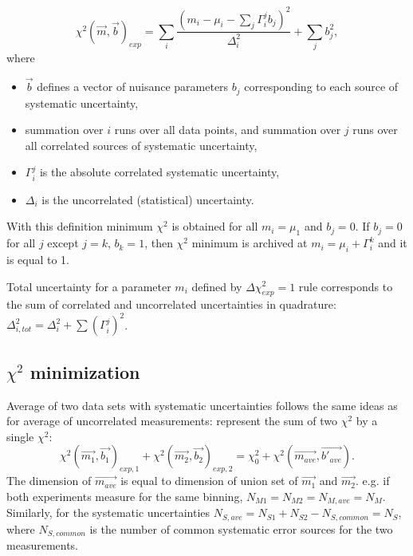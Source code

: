 \begin{equation}
  \chi^2(\vec{m},\vec{b})_{exp} = \sum_{i} \frac{(m_i-\mu_i-\sum_j \Gamma_i^j b_j)^2}{\Delta_i^2} + \sum_{j}
  b_j^2,
  \label{Eq:CorrChiSq}
\end{equation}
where
\begin{itemize}
\item $\vec{b}$ defines a vector of nuisance parameters $b_j$ corresponding to each source of systematic uncertainty,
\item summation over $i$ runs over all data points, and summation over $j$ runs over all correlated sources of systematic uncertainty,
\item $\Gamma_i^j$ is the absolute correlated systematic uncertainty, 
\item $\Delta_i$ is the uncorrelated (statistical) uncertainty.
\end{itemize}
With this definition minimum $\chi^2$ is obtained for all $m_i = \mu_1$ and $b_j=0$. If $b_j=0$ for all $j$ except $j=k$, $b_k=1$, then $\chi^2$ minimum is archived at $m_i = \mu_i + \Gamma_i^k$ and it is equal to 1.

Total uncertainty for a parameter $m_i$ defined by $\Delta \chi^2_{exp} = 1$ rule corresponds to the sum of correlated and uncorrelated uncertainties in quadrature: $\Delta^2_{i, tot} = \Delta^2_i + \sum (\Gamma^j_i)^2$.

\subsection{$\chi^2$ minimization}
\label{Sec:minimization}
Average of two data sets with systematic uncertainties follows the same ideas as for average of uncorrelated measurements: represent the sum of two $\chi^2$ by a single $\chi^2$:
\begin{equation}
  \chi^2(\vec{m_1},\vec{b_1})_{exp,1} + \chi^2(\vec{m_2},\vec{b_2})_{exp,2} =
  \chi^2_0 + \chi^2(\vec{m_{ave}},\vec{b'_{ave}}).
\end{equation}
The dimension of $\vec{m_{ave}}$ is equal to dimension of union set of $\vec{m_1}$ and $\vec{m_2}$. e.g. if both experiments measure for the same binning, $N_{M1} = N_{M2} = N_{M,ave} = N_M$. Similarly, for the systematic uncertainties $N_{S,ave} = N_{S1} + N_{S2} - N_{S, common} = N_S$, where $N_{S, common}$ is the number of common systematic error sources for the two measurements.

